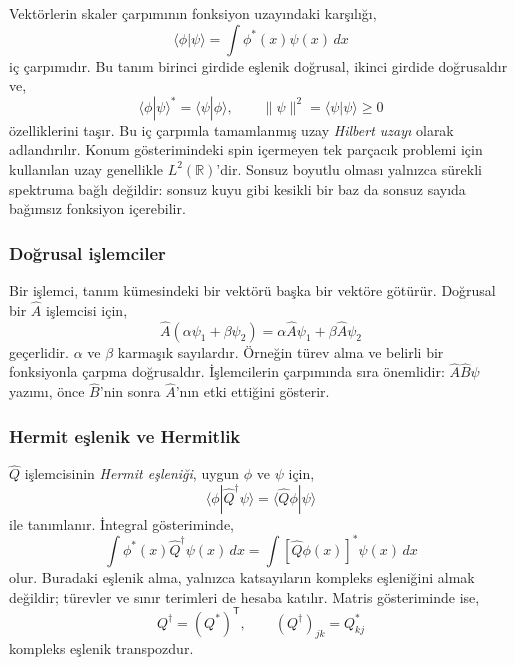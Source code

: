 Vektörlerin skaler çarpımının fonksiyon uzayındaki karşılığı,
\begin{equation}
 \langle\phi|\psi\rangle
 =\int\phi^*(x)\psi(x)\,dx
 \label{eq:05_ic_carpim}
\end{equation}
iç çarpımıdır. Bu tanım birinci girdide eşlenik doğrusal, ikinci
girdide doğrusaldır ve,
\begin{equation}
 \langle\phi|\psi\rangle^*=\langle\psi|\phi\rangle,
 \qquad \|\psi\|^2=\langle\psi|\psi\rangle\ge0
\end{equation}
özelliklerini taşır. Bu iç çarpımla tamamlanmış uzay
\emph{Hilbert uzayı} olarak adlandırılır. Konum gösterimindeki
spin içermeyen tek parçacık problemi için kullanılan uzay genellikle
$L^2(\mathbb R)$'dir. Sonsuz boyutlu olması yalnızca sürekli spektruma
bağlı değildir: sonsuz kuyu gibi kesikli bir baz da sonsuz sayıda
bağımsız fonksiyon içerebilir.

\subsubsection{Doğrusal işlemciler}

Bir işlemci, tanım kümesindeki bir vektörü başka bir vektöre götürür.
Doğrusal bir $\hat A$ işlemcisi için,
\begin{equation}
 \boxed{\hat A(\alpha\psi_1+\beta\psi_2)
 =\alpha\hat A\psi_1+\beta\hat A\psi_2}
 \label{eq:05_dogrusal}
\end{equation}
geçerlidir. $\alpha$ ve $\beta$ karmaşık sayılardır.
Örneğin türev alma ve belirli bir fonksiyonla çarpma doğrusaldır.
İşlemcilerin çarpımında sıra önemlidir: $\hat A\hat B\psi$ yazımı,
önce $\hat B$'nin sonra $\hat A$'nın etki ettiğini gösterir.

\subsubsection{Hermit eşlenik ve Hermitlik}

$\hat Q$ işlemcisinin \emph{Hermit eşleniği}, uygun $\phi$ ve $\psi$
için,
\begin{equation}
 \boxed{\langle\phi|\hat Q^\dagger\psi\rangle
       =\langle\hat Q\phi|\psi\rangle}
 \label{eq:05_eslenik_tanim}
\end{equation}
ile tanımlanır. İntegral gösteriminde,
\begin{equation}
 \int\phi^*(x)\hat Q^\dagger\psi(x)\,dx
 =\int[\hat Q\phi(x)]^*\psi(x)\,dx
\end{equation}
olur. Buradaki eşlenik alma, yalnızca katsayıların kompleks
eşleniğini almak değildir; türevler ve sınır terimleri de hesaba
katılır. Matris gösteriminde ise,
\begin{equation}
 Q^\dagger=(Q^*)^{\mathsf T},
 \qquad (Q^\dagger)_{jk}=Q_{kj}^*
\end{equation}
kompleks eşlenik transpozdur.

